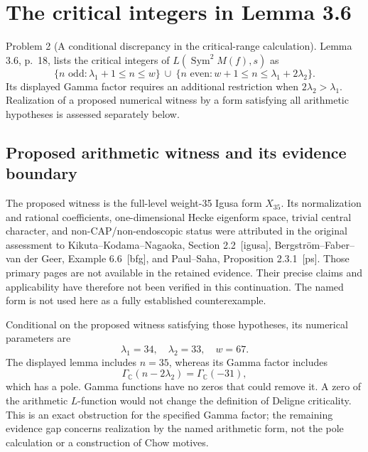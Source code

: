 \documentclass[10pt]{article}
\begin{document}
\section*{The critical integers in Lemma 3.6}
Problem 2 (A conditional discrepancy in the critical-range calculation).  Lemma 3.6, p. 18, lists the critical integers of \(L(\operatorname{Sym}^2M(f),s)\) as \[\{n\text{ odd}:\lambda_1+1\le n\le w\}
 \ \cup\
 \{n\text{ even}:w+1\le n\le\lambda_1+2\lambda_2\}.\] Its displayed Gamma factor requires an additional restriction when \(2\lambda_2>\lambda_1\). Realization of a proposed numerical witness by a form satisfying all arithmetic hypotheses is assessed separately below.\par
\subsection*{Proposed arithmetic witness and its evidence boundary}
The proposed witness is the full-level weight-35 Igusa form \(X_{35}\). Its normalization and rational coefficients, one-dimensional Hecke eigenform space, trivial central character, and non-CAP/non-endoscopic status were attributed in the original assessment to Kikuta–Kodama–Nagaoka, Section 2.2 [igusa], Bergström–Faber–van der Geer, Example 6.6 [bfg], and Paul–Saha, Proposition 2.3.1 [ps]. Those primary pages are not available in the retained evidence. Their precise claims and applicability have therefore not been verified in this continuation. The named form is not used here as a fully established counterexample.\par
Conditional on the proposed witness satisfying those hypotheses, its numerical parameters are \[\lambda_1=34,\quad\lambda_2=33,\quad w=67.\] The displayed lemma includes \(n=35\), whereas its Gamma factor includes \[\Gamma_{\mathbb C}(n-2\lambda_2)=\Gamma_{\mathbb C}(-31),\] which has a pole. Gamma functions have no zeros that could remove it. A zero of the arithmetic \(L\)-function would not change the definition of Deligne criticality. This is an exact obstruction for the specified Gamma factor; the remaining evidence gap concerns realization by the named arithmetic form, not the pole calculation or a construction of Chow motives.\par
\end{document}
